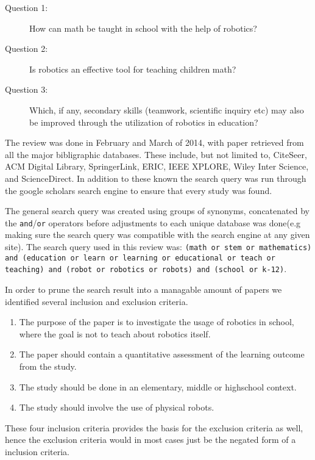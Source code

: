 \begin{description}
	\item[Question 1: ] How can math be taught in school with the help of robotics?
	\item[Question 2: ] Is robotics an effective tool for teaching children math?
	\item[Question 3: ] Which, if any, secondary skills (teamwork, scientific inquiry etc) may also be improved through the utilization of robotics in education?
\end{description}

\bigskip\noindent
The review was done in February and March of 2014, with paper retrieved from all the major bibligraphic databases. These include, but not limited to, CiteSeer, ACM Digital Library, SpringerLink, ERIC, IEEE XPLORE, Wiley Inter Science, and ScienceDirect. In addition to these known the search query was run through the 	google scholars search engine to ensure that every study was found.

\bigskip\noindent
The general search query was created using groups of synonyms, concatenated by the \texttt{and}/\texttt{or} operators before adjustments to each unique database was done(e.g making sure the search query was compatible with the search engine at any given site). The search query used in this review was: \texttt{(math or stem or mathematics) and (education or learn or learning or educational or teach or teaching) and (robot or robotics or robots) and (school or k-12)}. 

\bigskip\noindent
In order to prune the search result into a managable amount of papers we identified several inclusion and exclusion criteria. 
\begin{enumerate}
	\item The purpose of the paper is to investigate the usage of robotics in school, where the goal is not to teach about robotics itself.
	\item The paper should contain a quantitative assessment of the learning outcome from the study. 
	\item The study should be done in an elementary, middle or highschool context.
	\item The study should involve the use of physical robots.
\end{enumerate}

These four inclusion criteria provides the basis for the exclusion criteria as well, hence the exclusion criteria would in most cases just be the negated form of a inclusion criteria. 